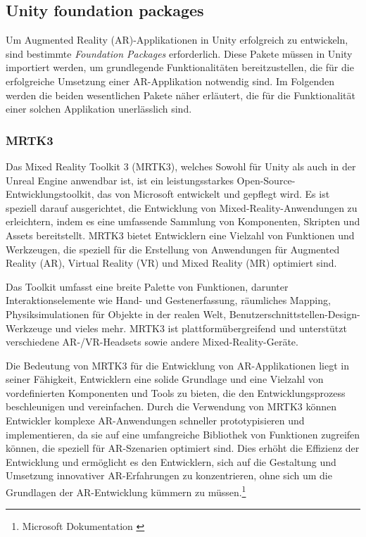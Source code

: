 \subsection{Unity foundation packages}
Um Augmented Reality (AR)-Applikationen in Unity erfolgreich zu entwickeln, sind bestimmte \textit{Foundation Packages}
erforderlich. Diese Pakete müssen in Unity importiert werden, um grundlegende Funktionalitäten bereitzustellen, die für
die erfolgreiche Umsetzung einer AR-Applikation notwendig sind. Im Folgenden werden die beiden wesentlichen Pakete näher
erläutert, die für die Funktionalität einer solchen Applikation unerlässlich sind.

\subsubsection{MRTK3}
Das Mixed Reality Toolkit 3 (MRTK3), welches Sowohl für Unity als auch in der Unreal Engine anwendbar ist, ist ein leistungsstarkes Open-Source-Entwicklungstoolkit, das von Microsoft entwickelt
und gepflegt wird. Es ist speziell darauf ausgerichtet, die Entwicklung von Mixed-Reality-Anwendungen zu erleichtern,
indem es eine umfassende Sammlung von Komponenten, Skripten und Assets bereitstellt. MRTK3 bietet Entwicklern eine Vielzahl
von Funktionen und Werkzeugen, die speziell für die Erstellung von Anwendungen für Augmented Reality (AR), Virtual Reality
(VR) und Mixed Reality (MR) optimiert sind.

Das Toolkit umfasst eine breite Palette von Funktionen, darunter Interaktionselemente wie Hand- und Gestenerfassung,
räumliches Mapping, Physiksimulationen für Objekte in der realen Welt, Benutzerschnittstellen-Design-Werkzeuge und vieles
mehr. MRTK3 ist plattformübergreifend und unterstützt verschiedene AR-/VR-Headsets sowie andere Mixed-Reality-Geräte.

Die Bedeutung von MRTK3 für die Entwicklung von AR-Applikationen liegt in seiner Fähigkeit, Entwicklern eine solide
Grundlage und eine Vielzahl von vordefinierten Komponenten und Tools zu bieten, die den Entwicklungsprozess beschleunigen
und vereinfachen. Durch die Verwendung von MRTK3 können Entwickler komplexe AR-Anwendungen schneller prototypisieren und
implementieren, da sie auf eine umfangreiche Bibliothek von Funktionen zugreifen können, die speziell für AR-Szenarien
optimiert sind. Dies erhöht die Effizienz der Entwicklung und ermöglicht es den Entwicklern, sich auf die Gestaltung und
Umsetzung innovativer AR-Erfahrungen zu konzentrieren, ohne sich um die Grundlagen der AR-Entwicklung kümmern zu müssen.\footnote{Microsoft Dokumentation \cite{Mixed Reality Toolkit 3}}

